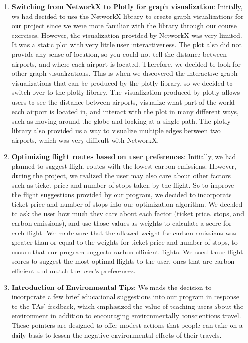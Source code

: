 \documentclass[11pt]{article}
\begin{document}
\begin{enumerate}
    \item \textbf{Switching from NetworkX to Plotly for graph visualization}: Initially, we had decided to use the NetworkX library to create graph visualizations for our project since we were more familiar with the library through our course exercises. However, the visualization provided by NetworkX was very limited. It was a static plot with very little user interactiveness. The plot also did not provide any sense of location, so you could not tell the distance between airports, and where each airport is located. Therefore, we decided to look for other graph visualizations. This is when we discovered the interactive graph visualizations that can be produced by the plotly library, so we decided to switch over to the plotly library. The visualization produced by plotly allows users to see the distance between airports, visualize what part of the world each airport is located in, and interact with the plot in many different ways, such as moving around the globe and looking at a single path. The plotly library also provided us a way to visualize multiple edges between two airports, which was very difficult with NetworkX.
    
    \item \textbf{Optimizing flight routes based on user preferences}: Initially, we had planned to suggest flight routes with the lowest carbon emissions. However, during the project, we realized the user may also care about other factors such as ticket price and number of stops taken by the flight. So to improve the flight suggestions provided by our program, we decided to incorporate ticket price and number of stops into our optimization algorithm. We decided to ask the user how much they care about each factor (ticket price, stops, and carbon emissions), and use those values as weights to calculate a score for each flight. We made sure that the allowed weight for carbon emissions was greater than or equal to the weights for ticket price and number of stops, to ensure that our program suggests carbon-efficient flights. We used these flight scores to suggest the most optimal flights to the user, ones that are carbon-efficient and match the user’s preferences.
    
    \item \textbf{Introduction of Environmental Tips}: We made the decision to incorporate a few brief educational suggestions into our program in response to the TAs' feedback, which emphasized the value of teaching users about the environment in addition to encouraging environmentally conscientious travel. These pointers are designed to offer modest actions that people can take on a daily basis to lessen the negative environmental effects of their travels.
    

\end{enumerate}
\end{document}

